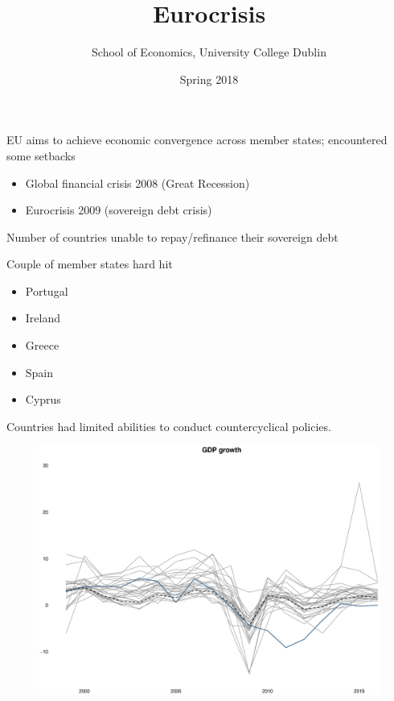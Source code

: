 \documentclass{beamer}
\title{Eurocrisis}
\author{School of Economics, University College Dublin}
\date{Spring 2018}
\begin{document}
\begin{frame}
 \titlepage
\end{frame}

\begin{frame}
 EU aims to achieve economic convergence across member states; encountered some setbacks
 \begin{itemize}
   \item Global financial crisis 2008 (Great Recession)
   \item Eurocrisis 2009 (sovereign debt crisis)
 \end{itemize}
 \medskip
 Number of countries unable to repay/refinance their sovereign debt
\end{frame}

\begin{frame}
  Couple of member states hard hit
  \begin{itemize}
    \item Portugal
    \item Ireland
    \item Greece
    \item Spain
    \medskip
    \item Cyprus
  \end{itemize}
  \medskip
  Countries had limited abilities to conduct countercyclical policies.
\end{frame}

\begin{frame}
  \begin{figure}
    \includegraphics[scale=.3]{gdp_growth.eps}
  \end{figure}
\end{frame}
\end{document}
